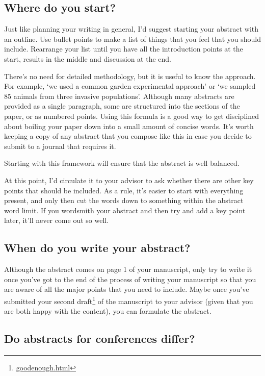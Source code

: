 \documentclass[
]{krantz}
\renewcommand{\href}[2]{#2\footnote{\url{#1}}}
\begin{document}
\hypertarget{where-do-you-start}{%
\subsection{Where do you start?}\label{where-do-you-start}}

Just like planning your writing in general, I'd suggest starting your abstract with an outline. Use bullet points to make a list of things that you feel that you should include. Rearrange your list until you have all the introduction points at the start, results in the middle and discussion at the end.

There's no need for detailed methodology, but it is useful to know the approach. For example, `we used a common garden experimental approach' or `we sampled 85 animals from three invasive populations'.
Although many abstracts are provided as a single paragraph, some are structured into the sections of the paper, or as numbered points. Using this formula is a good way to get disciplined about boiling your paper down into a small amount of concise words. It's worth keeping a copy of any abstract that you compose like this in case you decide to submit to a journal that requires it.

Starting with this framework will ensure that the abstract is well balanced.

At this point, I'd circulate it to your advisor to ask whether there are other key points that should be included. As a rule, it's easier to start with everything present, and only then cut the words down to something within the abstract word limit. If you wordsmith your abstract and then try and add a key point later, it'll never come out so well.

\hypertarget{when-do-you-write-your-abstract}{%
\subsection{When do you write your abstract?}\label{when-do-you-write-your-abstract}}

Although the abstract comes on page 1 of your manuscript, only try to write it once you've got to the end of the process of writing your manuscript so that you are aware of all the major points that you need to include. Maybe once you've \href{goodenough.html}{submitted your second draft} of the manuscript to your advisor (given that you are both happy with the content), you can formulate the abstract.

\hypertarget{do-abstracts-for-conferences-differ}{%
\subsection{Do abstracts for conferences differ?}\label{do-abstracts-for-conferences-differ}}
\end{document}
